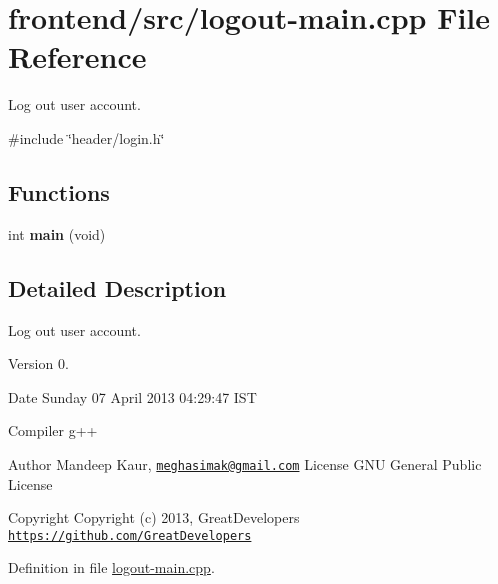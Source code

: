 \hypertarget{logout-main_8cpp}{\section{frontend/src/logout-\/main.cpp \-File \-Reference}
\label{logout-main_8cpp}
}


\-Log out user account.  


{\ttfamily \#include \char`\"{}header/login.\-h\char`\"{}}\*
\subsection*{\-Functions}
\begin{DoxyCompactItemize}
\item 
\hypertarget{logout-main_8cpp_a840291bc02cba5474a4cb46a9b9566fe}{int {\bfseries main} (void)}\label{logout-main_8cpp_a840291bc02cba5474a4cb46a9b9566fe}

\end{DoxyCompactItemize}


\subsection{\-Detailed \-Description}
\-Log out user account. \begin{DoxyVersion}{\-Version}
0. 
\end{DoxyVersion}
\begin{DoxyDate}{\-Date}
\-Sunday 07 \-April 2013 04\-:29\-:47 \-I\-S\-T\par
 \-Compiler g++
\end{DoxyDate}
\begin{DoxyAuthor}{\-Author}
\-Mandeep \-Kaur, \href{mailto:meghasimak@gmail.com}{\tt meghasimak@gmail.\-com} \-License \-G\-N\-U \-General \-Public \-License 
\end{DoxyAuthor}
\begin{DoxyCopyright}{\-Copyright}
\-Copyright (c) 2013, \-Great\-Developers \href{https://github.com/GreatDevelopers}{\tt https\-://github.\-com/\-Great\-Developers} 
\end{DoxyCopyright}


\-Definition in file \hyperlink{logout-main_8cpp_source}{logout-\/main.\-cpp}.

